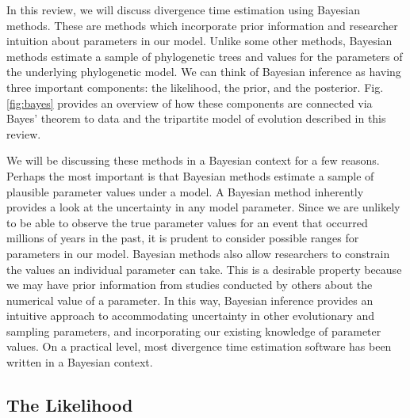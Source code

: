 \documentclass[11pt]{article}
\newcommand{\rw}[1]{{\textcolor{red}{[RW: #1]}}} %
\newcommand{\aw}[1]{{\textcolor{armygreen}{[AW: #1]}}} %
\begin{document}
In this review, we will discuss divergence time estimation using Bayesian methods. 
These are methods which incorporate prior information and researcher intuition about parameters in our model.
Unlike some other methods, Bayesian methods estimate a sample of phylogenetic trees and values for the parameters of the underlying phylogenetic model.
We can think of Bayesian inference as having three important components: the likelihood, the prior, and the posterior.
Fig. \ref{fig:bayes} provides an overview of how these components are connected via Bayes' theorem to data and the tripartite model of evolution described in this review.

We will be discussing these methods in a Bayesian context for a few reasons.
Perhaps the most important is that Bayesian methods estimate a sample of plausible parameter values under a model. 
A Bayesian method inherently provides a look at the uncertainty in any model parameter.
Since we are unlikely to be able to observe the true parameter values for an event that occurred millions of years in the past, it is prudent to consider possible ranges for parameters in our model.
Bayesian methods also allow researchers to constrain the values an individual parameter can take. 
This is a desirable property because we may have prior information from studies conducted by others about the numerical value of a parameter.
In this way, Bayesian inference provides an intuitive approach to accommodating uncertainty in other evolutionary and sampling parameters, and incorporating our existing knowledge of parameter values.
On a practical level, most divergence time estimation software has been written in a Bayesian context. %


\subsection{The Likelihood}
\end{document}
